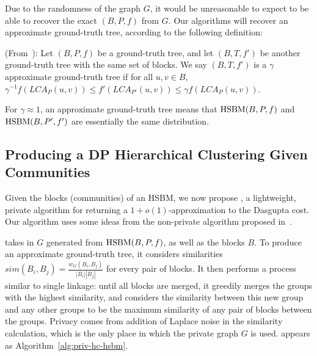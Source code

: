 Due to the randomness of the graph $G$, it would be unreasonable to expect to be able to recover the exact $(B,P,f)$ from $G$. Our algorithms will recover an approximate ground-truth tree, according to the following definition:

\begin{defn} (From~\citet{cohen2017hierarchical}):
Let $(B,P,f)$ be a ground-truth tree, and let $(B,T,f')$ be another ground-truth tree with the same set of blocks. We say $(B,T, f')$ is a $\gamma$ approximate ground-truth tree if for all $u, v \in B$, $
\gamma^{-1} f(LCA_P(u,v)) \leq f'(LCA_{P'}(u,v)) \leq \gamma f(LCA_P(u,v))$.
\end{defn}
For $\gamma \approx 1$, an approximate ground-truth tree means that $\textnormal{HSBM}(B,P,f)$ and $\textnormal{HSBM}(B,P',f')$ are essentially the same distribution.

\subsection{Producing a DP Hierarchical Clustering Given Communities}\label{sec:priv-hc-hsbm}

Given the blocks (communities) of an HSBM, we now propose \dphcblocks{}, a lightweight, private algorithm for returning a $1+o(1)$-approximation to the Dasgupta cost. Our algorithm uses some ideas from the non-private algorithm proposed in~\citet{cohen2017hierarchical,cohen2019hierarchical}.

\dphcblocks{} takes in $G$ generated from $\textnormal{HSBM}(B,P,f)$, as well as the blocks $B$. 
To produce an approximate ground-truth tree, it considers similarities $sim(B_i, B_j) = \frac{w_G(B_i, B_j)}{|B_i||B_j|}$ for every pair of blocks. It then performs a process similar to single linkage: until all blocks are merged, it greedily merges the groups with the highest similarity, and considers the similarity between this new group and any other groups to be the maximum similarity of any pair of blocks between the groups. Privacy comes from addition of Laplace noise in the similarity calculation, which is the only place in which the private graph $G$ is used. \dphcblocks{} appears as Algorithm~\ref{alg:priv-hc-hsbm}.

